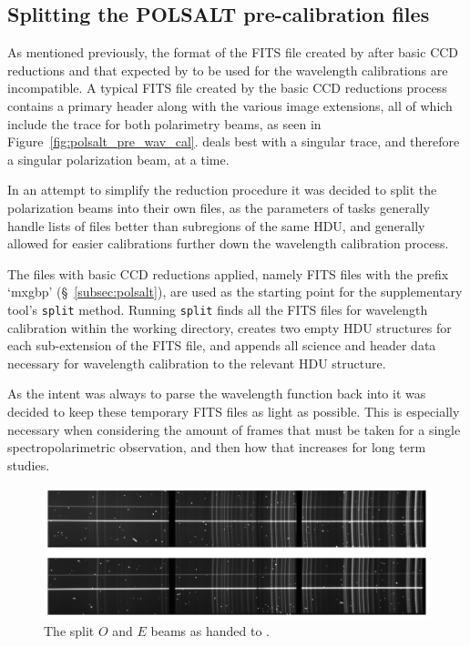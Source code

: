 \subsection{Splitting the POLSALT pre-calibration files}

As mentioned previously, the format of the \gls{FITS} file created by \polsalt after basic \gls{CCD} reductions and that expected by \iraf to be used for the wavelength calibrations are incompatible. A typical \gls{FITS} file created by the \polsalt basic \gls{CCD} reductions process contains a primary header along with the various image extensions, all of which include the trace for both polarimetry beams, as seen in Figure~\ref{fig:polsalt_pre_wav_cal}. \iraf deals best with a singular trace, and therefore a singular polarization beam, at a time.
\prgph

In an attempt to simplify the \iraf reduction procedure it was decided to split the polarization beams into their own files, as the parameters of \iraf tasks generally handle lists of files better than subregions of the same \gls{HDU}, and generally allowed for easier calibrations further down the \iraf wavelength calibration process.
\prgph

The \polsalt files with basic \gls{CCD} reductions applied, namely \gls{FITS} files with the prefix `mxgbp' (\S~\ref{subsec:polsalt}), are used as the starting point for the supplementary tool's \texttt{split} method. Running \texttt{split} finds all the \gls{FITS} files for wavelength calibration within the working directory, creates two empty \gls{HDU} structures for each sub-extension of the \gls{FITS} file, and appends all science and header data necessary for wavelength calibration to the relevant \gls{HDU} structure.
\prgph

As the intent was always to parse the wavelength function back into \polsalt it was decided to keep these temporary \gls{FITS} files as light as possible. This is especially necessary when considering the amount of frames that must be taken for a single spectropolarimetric observation, and then how that increases for long term studies.
\prgph

\begin{figure}[t]
    \centering
    \includegraphics[width = 1.0\textwidth]{figures/3_OEsplit.pdf}
    \caption{The split $O$ and $E$ beams as handed to \iraf.}
    \label{fig:OE_split}
\end{figure}

